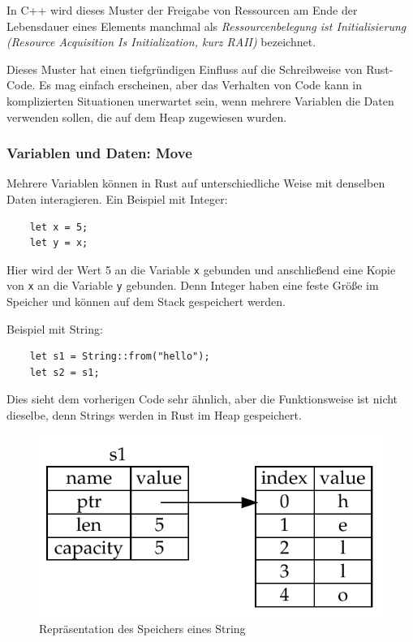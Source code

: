 In C++ wird dieses Muster der Freigabe von Ressourcen am Ende der Lebensdauer eines Elements manchmal als \textit{Ressourcenbelegung ist Initialisierung (Resource Acquisition Is Initialization, kurz RAII)} bezeichnet. \cite[p.~71]{CppProg}

Dieses Muster hat einen tiefgründigen Einfluss auf die Schreibweise von Rust-Code. Es mag einfach erscheinen, aber das Verhalten von Code kann in komplizierten Situationen unerwartet sein, wenn mehrere Variablen die Daten verwenden sollen, die auf dem Heap zugewiesen wurden.

\subsubsection{Variablen und Daten: Move}

Mehrere Variablen können in Rust auf unterschiedliche Weise mit denselben Daten interagieren. Ein Beispiel mit Integer:

\begin{lstlisting}
    let x = 5;
    let y = x;
\end{lstlisting}

Hier wird der Wert 5 an die Variable \verb"x" gebunden und anschließend eine Kopie von \verb"x" an die Variable \verb"y" gebunden. Denn Integer haben eine feste Größe im Speicher und können auf dem Stack gespeichert werden.

Beispiel mit String:

\begin{lstlisting}
    let s1 = String::from("hello");
    let s2 = s1;
\end{lstlisting}

Dies sieht dem vorherigen Code sehr ähnlich, aber die Funktionsweise ist nicht dieselbe, denn Strings werden in Rust im Heap gespeichert.

\begin{figure}[htbp]
    \centering
    \includegraphics[scale=0.9]{Programmierung/Tabelle1.pdf}
    \caption{Repräsentation des Speichers eines String}
    \label{fig:tabelle1}
\end{figure}

